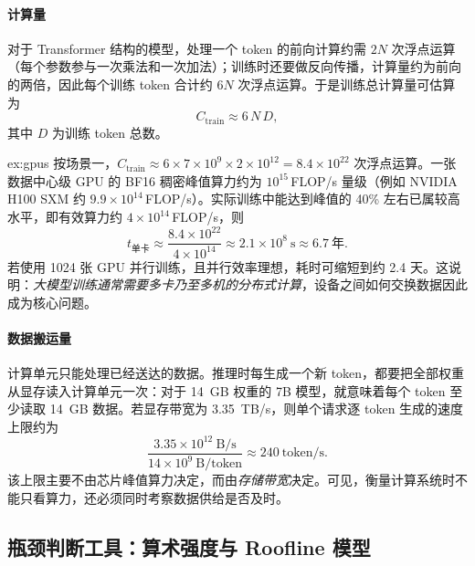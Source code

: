 \paragraph{计算量} 对于 Transformer 结构的模型，处理一个 token 的前向计算约需 $2N$ 次浮点运算（每个参数参与一次乘法和一次加法）；训练时还要做反向传播，计算量约为前向的两倍，因此每个训练 token 合计约 $6N$ 次浮点运算\cite{kaplan2020scaling}。于是训练总计算量可估算为
\begin{equation}
  C_{\mathrm{train}} \approx 6\,N\,D,
  \label{eq:train-flops}
\end{equation}
其中 $D$ 为训练 token 总数。

\begin{example}[训练需要多少张卡]{ex:gpus}
按场景一，$C_{\mathrm{train}}\approx 6\times7\times10^{9}\times2\times10^{12}=8.4\times10^{22}$ 次浮点运算。一张数据中心级 GPU 的 BF16 稠密峰值算力约为 $10^{15}$\,FLOP/s 量级（例如 NVIDIA H100 SXM 约 $9.9\times10^{14}$\,FLOP/s\cite{nvidia2023h100}）。实际训练中能达到峰值的 40\% 左右已属较高水平，即有效算力约 $4\times10^{14}$\,FLOP/s，则
\[
  t_{\text{单卡}} \approx \frac{8.4\times10^{22}}{4\times10^{14}} \approx 2.1\times10^{8}\ \text{s} \approx 6.7\ \text{年}.
\]
若使用 1024 张 GPU 并行训练，且并行效率理想，耗时可缩短到约 2.4 天。这说明：\emph{大模型训练通常需要多卡乃至多机的分布式计算}，设备之间如何交换数据因此成为核心问题。
\end{example}

\paragraph{数据搬运量} 计算单元只能处理已经送达的数据。推理时每生成一个新 token，都要把全部权重从显存读入计算单元一次：对于 \SI{14}{GB} 权重的 7B 模型，就意味着每个 token 至少读取 \SI{14}{GB} 数据。若显存带宽为 \SI{3.35}{TB/s}，则单个请求逐 token 生成的速度上限约为
\[
  \frac{3.35\times10^{12}\ \text{B/s}}{14\times10^{9}\ \text{B/token}} \approx 240\ \text{token/s}.
\]
该上限主要不由芯片峰值算力决定，而由\emph{存储带宽}决定。可见，衡量计算系统时不能只看算力，还必须同时考察数据供给是否及时。

\subsection{瓶颈判断工具：算术强度与 Roofline 模型}
\label{subsec:roofline}

